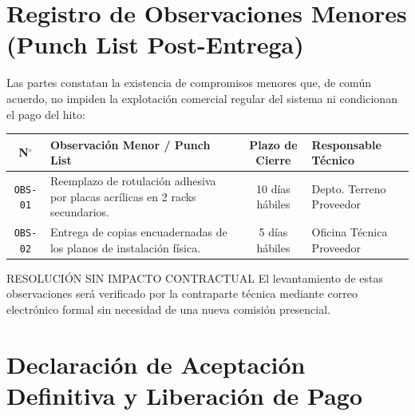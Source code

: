 \documentclass[11pt,letterpaper]{article}
\begin{document}
\vspace{0.6em}

\section{Registro de Observaciones Menores (Punch List Post-Entrega)}

Las partes constatan la existencia de compromisos menores que, de com\'un acuerdo, no impiden la explotaci\'on comercial regular del sistema ni condicionan el pago del hito:

\vspace{0.3em}

\noindent
\begin{tabularx}{\linewidth}{@{}c p{5.5cm} c p{4.2cm}@{}}
  \toprule
  \textbf{\color{corpPrimary}N$^\circ$} & \textbf{\color{corpPrimary}Observaci\'on Menor / Punch List} & \textbf{\color{corpPrimary}Plazo de Cierre} & \textbf{\color{corpPrimary}Responsable T\'ecnico} \\
  \midrule
  \texttt{OBS-01} & Reemplazo de rotulaci\'on adhesiva por placas acr\'ilicas en 2 racks secundarios. & 10 d\'ias h\'abiles & Depto. Terreno Proveedor \\
  \addlinespace[2pt]
  \texttt{OBS-02} & Entrega de copias encuadernadas de los planos de instalaci\'on f\'isica. & 5 d\'ias h\'abiles & Oficina T\'ecnica Proveedor \\
  \bottomrule
\end{tabularx}

\vspace{0.4em}

\begin{corpnote}{RESOLUCI\'ON SIN IMPACTO CONTRACTUAL}
  El levantamiento de estas observaciones ser\'a verificado por la contraparte t\'ecnica mediante correo electr\'onico formal sin necesidad de una nueva comisi\'on presencial.
\end{corpnote}

\newpage

\section{Declaraci\'on de Aceptaci\'on Definitiva y Liberaci\'on de Pago}
\end{document}
